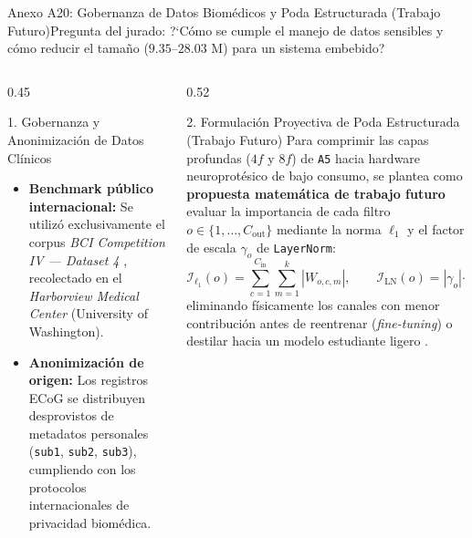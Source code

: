 \begin{frame}{Anexo A20: Gobernanza de Datos Biom\'edicos y Poda Estructurada (Trabajo Futuro)}{Pregunta del jurado: ?`C\'omo se cumple el manejo de datos sensibles y c\'omo reducir el tama\~no ($9.35\text{--}28.03\text{ M}$) para un sistema embebido?}
  \label{anexo:poda_y_privacidad}
  \begin{columns}[T,onlytextwidth]
    \begin{column}{0.45\textwidth}
      \begin{block}{1. Gobernanza y Anonimizaci\'on de Datos Cl\'inicos}
        \scriptsize
        \begin{itemize}\setlength{\itemsep}{3pt}
          \item \textbf{Benchmark p\'ublico internacional:} Se utiliz\'o exclusivamente el corpus \textit{BCI Competition IV --- Dataset 4} \cite{miller2008prediction}, recolectado en el \textit{Harborview Medical Center} (University of Washington).
          \item \textbf{Anonimizaci\'on de origen:} Los registros ECoG se distribuyen desprovistos de metadatos personales (\texttt{sub1}, \texttt{sub2}, \texttt{sub3}), cumpliendo con los protocolos internacionales de privacidad biom\'edica.
        \end{itemize}
      \end{block}
    \end{column}

    \begin{column}{0.52\textwidth}
      \begin{block}{2. Formulaci\'on Proyectiva de Poda Estructurada (Trabajo Futuro)}
        \scriptsize
        Para comprimir las capas profundas ($4f$ y $8f$) de \texttt{A5} hacia hardware neuroprot\'esico de bajo consumo, se plantea como \textbf{propuesta matem\'atica de trabajo futuro} evaluar la importancia de cada filtro $o \in \{1,\dots,C_{\text{out}}\}$ mediante la norma $\ell_1$ y el factor de escala $\gamma_o$ de \texttt{LayerNorm}:
        \[
          \mathcal{I}_{\ell_1}(o) = \sum_{c=1}^{C_{\text{in}}}\sum_{m=1}^{k} |W_{o,c,m}|, \qquad \mathcal{I}_{\text{LN}}(o) = |\gamma_o|\cdot \|\mathbf{W}_{o,:,:}\|_2
        \]
        eliminando f\'isicamente los canales con menor contribuci\'on antes de reentrenar (\textit{fine-tuning}) o destilar hacia un modelo estudiante ligero \cite{rodas_valencia_tpe_ecog}.
      \end{block}
      \vspace{1mm}
      \hfill\hyperlink{anexo:indice_extra}{}
    \end{column}
  \end{columns}
\end{frame}
